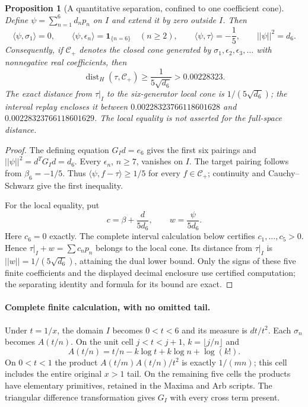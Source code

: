 \documentclass[11pt]{article}
\def\norm#1{||#1||}%
\newtheorem{proposition}[theorem]{Proposition}
\theoremstyle{remark}
\newcommand{\norm}[1]{\left\lVert #1\right\rVert}
\begin{document}
\begin{proposition}[A quantitative separation, confined to one coefficient cone]
\label{prop:ns64-cone-distance}
Define $\psi=\sum_{n=1}^6d_np_n$ on $I$ and extend it by zero outside
$I$. Then
\[
 \langle\psi,\sigma_1\rangle=0,\qquad
 \langle\psi,\epsilon_n\rangle=\mathbf1_{\{n=6\}}\quad(n\geq2),
 \qquad \langle\psi,\tau\rangle=-\frac15,
 \qquad \norm\psi^2=d_6.
\]
Consequently, if $\mathcal C_+$ denotes the closed cone generated by
$\sigma_1,\epsilon_2,\epsilon_3,\ldots$ with nonnegative real
coefficients, then
\begin{equation}
 \operatorname{dist}_H(\tau,\mathcal C_+)
 \geq\frac1{5\sqrt{d_6}}>0.00228323.
 \label{eq:ns64-positive-gap}
\end{equation}
The exact distance from $\tau|_I$ to the six-generator local cone is
$1/(5\sqrt{d_6})$; the interval replay encloses it between
$0.00228323766118601628$ and $0.00228323766118601629$.
The local equality is not asserted for the full-space distance.
\end{proposition}
\begin{proof}
The defining equation $G_Id=e_6$ gives the first six pairings and
$\norm\psi^2=d^TG_Id=d_6$. Every $\epsilon_n$, $n\geq7$, vanishes
on $I$. The target pairing follows from $\beta_6=-1/5$.
Thus $\langle\psi,f-\tau\rangle\geq1/5$ for every $f\in\mathcal C_+$;
continuity and Cauchy--Schwarz give the first inequality.

For the local equality, put
\[
 c=\beta+\frac{d}{5d_6},\qquad w=\frac{\psi}{5d_6}.
\]
Here $c_6=0$ exactly. The complete interval calculation below certifies
$c_1,\ldots,c_5>0$. Hence $\tau|_I+w=\sum c_np_n$ belongs to the
local cone. Its distance from $\tau|_I$ is $\norm w=1/(5\sqrt{d_6})$,
attaining the dual lower bound. Only the signs of these five finite
coefficients and the displayed decimal enclosure use certified
computation; the separating identity and formula for its bound are exact.
\end{proof}

\paragraph{Complete finite calculation, with no omitted tail.}
Under $t=1/x$, the domain $I$ becomes $0<t<6$ and its measure is
$dt/t^2$. Each $\sigma_n$ becomes $A(t/n)$. On the unit cell
$j<t<j+1$, $k=\lfloor j/n\rfloor$ and
\[
 A(t/n)=t/n-k\log t+k\log n+\log(k!).
\]
On $0<t<1$ the product $A(t/m)A(t/n)/t^2$ is exactly $1/(mn)$;
this cell includes the entire original $x>1$ tail. On the remaining
five cells the products have elementary primitives, retained in the
Maxima and Arb scripts. The triangular difference transformation gives
$G_I$ with every cross term present.
\end{document}
